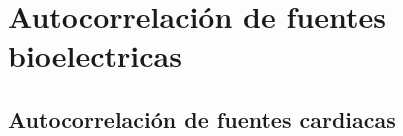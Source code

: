 \section{Autocorrelación de fuentes bioelectricas}

%

\subsection{Autocorrelación  de fuentes cardiacas}

